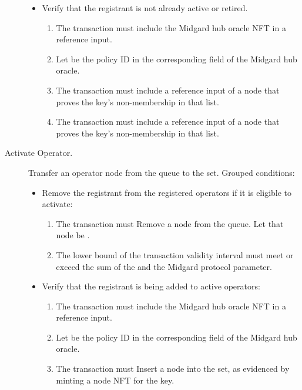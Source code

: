\documentclass[../midgard.tex]{subfiles}
\begin{document}
\begin{description}
\begin{itemize}
            \item Verify that the registrant is not already active or retired.
            \begin{enumerate}[resume]
                \item The transaction must include the Midgard hub oracle NFT in a reference input.
                \item Let  be the policy ID in the corresponding field of the Midgard hub oracle.
                \item The transaction must include a reference input of a  node that proves the  key's non-membership in that list.
                \item The transaction must include a reference input of a  node that proves the  key's non-membership in that list.
            \end{enumerate}
        \end{itemize}
    \item[Activate Operator.] Transfer an operator node from the  queue to the  set.
      Grouped conditions:
        \begin{itemize}
            \item Remove the registrant from the registered operators if it is eligible to activate:
            \begin{enumerate}
                \item The transaction must Remove a node from the  queue.
                  Let that node be .
                \item The lower bound of the transaction validity interval must meet or exceed the sum of the  and the Midgard  protocol parameter.
            \end{enumerate}
            \item Verify that the registrant is being added to active operators:
            \begin{enumerate}[resume]
                \item The transaction must include the Midgard hub oracle NFT in a reference input.
                \item Let  be the policy ID in the corresponding field of the Midgard hub oracle.
                \item The transaction must Insert a node into the  set, as evidenced by minting a  node NFT for the  key.

\end{enumerate}
\end{itemize}
\end{description}
\end{document}
